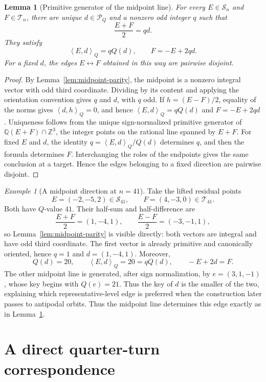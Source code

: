 \documentclass[11pt]{amsart}
\newtheorem{lemma}[theorem]{Lemma}
\theoremstyle{definition}
\theoremstyle{remark}
\newtheorem{example}[theorem]{Example}
\newcommand{\Sn}{\mathcal S_n}
\newcommand{\Tn}{\mathcal T_n}
\newcommand{\Dcal}{\mathcal P_Q}
\newcommand{\Qip}[2]{\left\langle #1,#2\right\rangle_Q}
\begin{document}
\begin{lemma}[Primitive generator of the midpoint line]
\label{lem:midpoint-direction}
For every $E\in\Sn$ and $F\in\Tn$, there are unique $d\in\Dcal$ and a
nonzero odd integer $q$ such that
\[
 \frac{E+F}{2}=qd.
\]
They satisfy
\[
 \Qip{E}{d}=qQ(d),
 \qquad
 F=-E+2qd.
\]
For a fixed $d$, the edges $E\leftrightarrow F$ obtained in this way are
pairwise disjoint.
\end{lemma}

\begin{proof}
By Lemma~\ref{lem:midpoint-parity}, the midpoint is a nonzero integral vector
with odd third coordinate.  Dividing by its content and applying the
orientation convention gives $q$ and $d$, with $q$ odd.  If
$h=(E-F)/2$, equality of the norms gives $\Qip{d}{h}=0$, and hence
$\Qip{E}{d}=qQ(d)$ and $F=-E+2qd$.  Uniqueness follows from the unique
sign-normalized primitive generator of
$\mathbb Q(E+F)\cap\mathbb Z^3$, the integer points on the rational line
spanned by $E+F$.  For fixed $E$ and $d$, the identity
$q=\Qip{E}{d}/Q(d)$ determines $q$, and then the formula determines $F$.
Interchanging the roles of the endpoints gives the same conclusion at a
target.  Hence the edges belonging to a fixed direction are pairwise
disjoint.
\end{proof}

\begin{example}[A midpoint direction at $n=41$]
\label{ex:midpoint-41}
Take the lifted residual points
\[
 E=(-2,-5,2)\in\mathcal S_{41},
 \qquad
 F=(4,-3,0)\in\mathcal T_{41}.
\]
Both have $Q$-value $41$.  Their half-sum and half-difference are
\[
 \frac{E+F}{2}=(1,-4,1),
 \qquad
 \frac{E-F}{2}=(-3,-1,1),
\]
so Lemma~\ref{lem:midpoint-parity} is visible directly: both vectors are
integral and have odd third coordinate.  The first vector is already
primitive and canonically oriented, hence $q=1$ and
$d=(1,-4,1)$.  Moreover,
\[
 Q(d)=20,
 \qquad
 \Qip{E}{d}=20=qQ(d),
 \qquad
 -E+2d=F.
\]
The other midpoint line is generated, after sign normalization, by
$e=(3,1,-1)$, whose key begins with $Q(e)=21$.  Thus the key of $d$ is the
smaller of the two, explaining which representative-level edge is preferred
when the construction later passes to antipodal orbits.
Thus the midpoint line determines this edge exactly as in
Lemma~\ref{lem:midpoint-direction}.
\end{example}

\section{A direct quarter-turn correspondence}\label{sec:quarter-turn}
\end{document}
